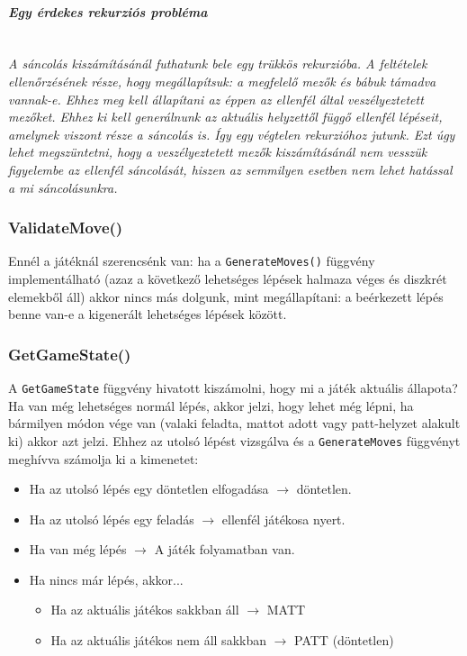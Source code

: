 \documentclass[twoside, a4paper, 12pt]{book}
\begin{document}
\paragraph{\textit{Egy érdekes rekurziós probléma}} \mbox{} \\
\textit{A sáncolás kiszámításánál futhatunk bele egy trükkös rekurzióba. A feltételek ellenőrzésének része, hogy megállapítsuk: a megfelelő mezők és bábuk támadva vannak-e. Ehhez meg kell állapítani az éppen az ellenfél által veszélyeztetett mezőket. Ehhez ki kell generálnunk az aktuális helyzettől függő ellenfél lépéseit, amelynek viszont része a sáncolás is. Így egy végtelen rekurzióhoz jutunk. Ezt úgy lehet megszüntetni, hogy a veszélyeztetett mezők kiszámításánál nem vesszük figyelembe az ellenfél sáncolását, hiszen az semmilyen esetben nem lehet hatással a mi sáncolásunkra.}

\subsubsection{ValidateMove()} \mbox{}
Ennél a játéknál szerencsénk van: ha a \texttt{GenerateMoves()} függvény implementálható (azaz a következő lehetséges lépések halmaza véges és diszkrét elemekből áll) akkor nincs más dolgunk, mint megállapítani: a beérkezett lépés benne van-e a kigenerált lehetséges lépések között.

\subsubsection{GetGameState()}
A \texttt{GetGameState} függvény hivatott kiszámolni, hogy mi a játék aktuális állapota? Ha van még lehetséges normál lépés, akkor jelzi, hogy lehet még lépni, ha bármilyen módon vége van (valaki feladta, mattot adott vagy patt-helyzet alakult ki) akkor azt jelzi. Ehhez az utolsó lépést vizsgálva és a \texttt{GenerateMoves} függvényt meghívva számolja ki a kimenetet:

\begin{itemize}
	\item Ha az utolsó lépés egy döntetlen elfogadása $\to$ döntetlen.
	\item Ha az utolsó lépés egy feladás $\to$ ellenfél játékosa nyert.
	\item Ha van még lépés $\to$ A játék folyamatban van.
	\item Ha nincs már lépés, akkor...
	\begin{itemize}
		\item Ha az aktuális játékos sakkban áll $\to$ MATT
		\item Ha az aktuális játékos nem áll sakkban $\to$ PATT (döntetlen)
	\end{itemize}
\end{itemize}
\end{document}

